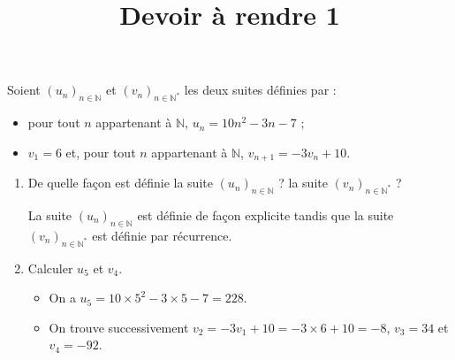 \documentclass[a4paper,dvipsnames]{article}
\title{Devoir à rendre 1}
\author{}
\date{}
\newcommand{\un}{\left(u_n\right)_{n\in\mathbb{N}}}
\newcommand{\vns}{\left(v_n\right)_{n\in\mathbb{N}^\ast}}
\newcommand{\N}{\mathbb{N}}
\newenvironment{correction}{\color{blue}}{}
\begin{document}
\renewcommand{\contentsname}{}

\pagestyle{fancy}

\begin{tcolorbox}[colframe=blue!75, colback=blue!45, valign=center, height=1.5cm, top=5mm]
  \maketitle
\end{tcolorbox}


\vspace{1cm}

\thispagestyle{fancy}

\begin{exercice}{}{}
  Soient $\un$ et $\vns$ les deux suites définies par :
  \begin{itemize}
    \item pour tout $n$ appartenant à $\N$, $u_n=10n^2-3n-7$ ;
    \item $v_1=6$ et, pour tout $n$ appartenant à $\N$, $v_{n+1}=-3v_n+10$.
  \end{itemize}
  \begin{enumerate}
    \item De quelle façon est définie la suite $\un$ ? la suite $\vns$ ?

      \begin{correction}
	La suite $\un$ est définie de façon explicite tandis que la suite $\vns$ est définie par récurrence.
      \end{correction}

    \item Calculer $u_5$ et $v_4$.

      \begin{correction}
	\begin{itemize}
	  \item On a $u_5=10\times5^2-3\times5-7=228$.
	  \item On trouve successivement $v_2=-3v_1+10=-3\times6+10=-8$, $v_3=34$ et $v_4=-92$.
	\end{itemize}
      \end{correction}
  \end{enumerate}
\end{exercice}

\bigskip
\end{document}
